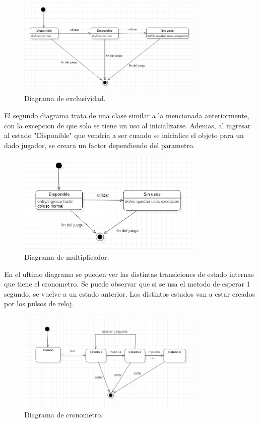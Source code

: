 \documentclass[titlepage,a4paper]{article}
\begin{document}
\begin{figure}[H]
    \centering
    \includegraphics[width=0.8\textwidth]{DiagramaDeEstadoExclusividad.png}
    \caption{\label{fig:class03}Diagrama de exclusividad.}
\end{figure}

El segundo diagrama trata de una clase similar a la mencionada anteriormente, con la excepcion de que solo se tiene un uso al inicializarse. Ademas, al ingresar al estado "Disponible" que vendria a ser cuando se inicialice el objeto para un dado jugador, se creara un factor dependiendo del parametro.

\begin{figure}[H]
    \centering
    \includegraphics[width=0.8\textwidth]{DiagramaDeEstadoMultiplicador.png}
    \caption{\label{fig:class03}Diagrama de multiplicador.}
\end{figure}

En el ultimo diagrama se pueden  ver las distintas transiciones de estado internas que tiene el cronometro. Se puede observar que si se usa el metodo de esperar 1 segundo, se vuelve a un estado anterior. Los distintos estados van a estar creados por los pulsos de reloj.

\begin{figure}[H]
    \centering
    \includegraphics[width=0.8\textwidth]{DiagramaDeEstadoCronometro.png}
    \caption{\label{fig:class03}Diagrama de cronometro.}
\end{figure}
\end{document}
